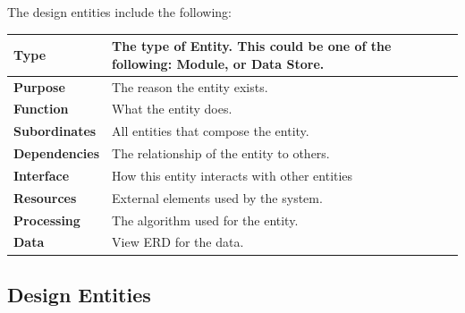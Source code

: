 \documentclass{article}
\begin{document}
The design entities include the following:

\begin{tabular}{ | l |  p{13.3cm} |}
\hline
\textbf{Type} & The type of Entity. This could be one of the following: Module, or Data Store. \\ \hline
\textbf{Purpose} & The reason the entity exists.  \\ \hline
\textbf{Function} & What the entity does. \\ \hline
\textbf{Subordinates} & All entities that compose the entity. \\ \hline
\textbf{Dependencies} & The relationship of the entity to others. \\ \hline
\textbf{Interface} & How this entity interacts with other entities \\ \hline
\textbf{Resources} & External elements used by the system. \\ \hline
\textbf{Processing} & The algorithm used for the entity. \\ \hline
\textbf{Data} & View ERD for the data. \\ \hline
\end{tabular}

\subsection{Design Entities}
\end{document}
